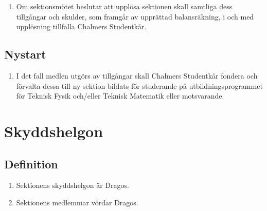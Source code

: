 \documentclass[11pt,a4paper]{article}
\begin{document}
\begin{enumerate}[\thesubsection .1]

  \item Om sektionsmötet beslutar att upplösa sektionen skall samtliga
  dess tillgångar och skulder, som framgår av upprättad balansräkning,
  i och med upplösning tillfalla Chalmers Studentkår.

\end{enumerate}

\subsection{Nystart}

\begin{enumerate}[\thesubsection .1]

  \item I det fall medlen utgörs av tillgångar skall Chalmers Studentkår fondera och förvalta dessa till ny sektion bildats för studerande på utbildningsprogrammet för Teknisk Fysik och/eller Teknisk Matematik eller motsvarande.

\end{enumerate}

\newpage

\section{Skyddshelgon}

\subsection{Definition}

\begin{enumerate}[\thesubsection .1]

  \item Sektionens skyddshelgon är Dragos.

  \item Sektionens medlemmar vördar Dragos.

\end{enumerate}

\end{document}
